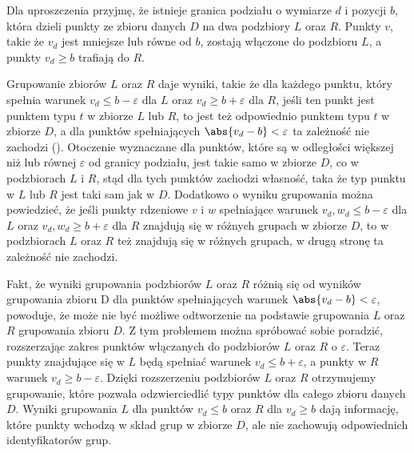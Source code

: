 Dla uproszczenia przyjmę, że istnieje granica podziału o wymiarze $ d $ i pozycji $ b $, która dzieli punkty ze zbioru danych $ D $ na dwa podzbiory $ L $ oraz $ R $. Punkty $ v $, takie że $ v_d $ jest mniejsze lub równe od $ b $, zostają włączone do podzbioru $ L $, a punkty $ v_d \ge b $ trafiają do $ R $.



Grupowanie zbiorów $ L $ oraz $ R $ daje wyniki, takie że dla każdego punktu, który spełnia warunek $ v_d \le b - \varepsilon $ dla $ L $ oraz $ v_d \ge b + \varepsilon $ dla $ R $, jeśli ten punkt jest punktem typu $ t $ w zbiorze $ L $ lub $ R $, to jest też odpowiednio punktem typu $ t $ w zbiorze $ D $, a dla punktów spełniających $ \abs{v_d - b} < \varepsilon  $ ta zależność nie zachodzi (). Otoczenie wyznaczane dla punktów, które są w odległości większej niż lub równej $ \varepsilon $ od granicy podziału, jest takie samo w zbiorze $ D $, co w podzbiorach $ L $ i $ R $, stąd dla tych punktów zachodzi własność, taka że typ punktu w $ L $ lub $ R $ jest taki sam jak w $ D $. Dodatkowo o wyniku grupowania można powiedzieć, że jeśli punkty rdzeniowe $ v $ i $ w $ spełniające  warunek $ v_d, w_d \le b - \varepsilon $ dla $ L $ oraz $ v_d, w_d \ge b + \varepsilon $ dla $ R $ znajdują się w różnych grupach w zbiorze $ D $, to w podzbiorach $ L $ oraz $ R $ też znajdują się w różnych grupach, w drugą stronę ta zależność nie zachodzi.\par
Fakt, że wyniki grupowania podzbiorów $ L $ oraz $ R $ różnią się od wyników grupowania zbioru D dla punktów spełniających warunek $ \abs{v_d-b} < \varepsilon $, powoduje, że może nie być możliwe odtworzenie na podstawie grupowania $ L $ oraz $ R $ grupowania zbioru $ D $. Z tym problemem można spróbować sobie poradzić, rozszerzając zakres punktów włączanych do podzbiorów $ L $ oraz $ R $ o $ \varepsilon $. Teraz punkty znajdujące się w $ L $ będą spełniać warunek $ v_d \le b + \varepsilon $, a punkty w $ R $ warunek $ v_d \ge b - \varepsilon $. Dzięki rozszerzeniu podzbiorów $ L $ oraz $ R $ otrzymujemy grupowanie, które pozwala odzwierciedlić typy punktów dla całego zbioru danych $ D $. Wyniki grupowania $ L $ dla punktów $ v_d \le b $ oraz $ R $ dla $ v_d \ge b $ dają informację, które punkty wchodzą w skład grup w zbiorze $ D $, ale nie zachowują odpowiednich identyfikatorów grup.\par
